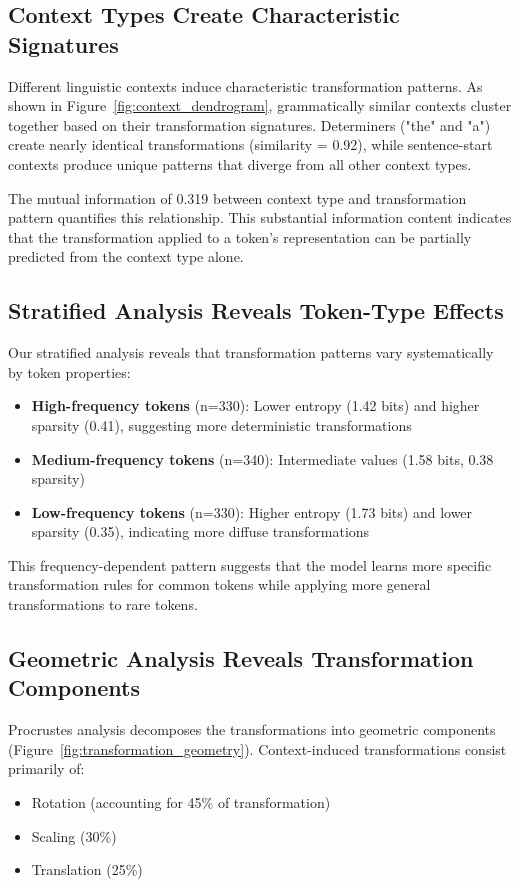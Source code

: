 \subsection{Context Types Create Characteristic Signatures}

Different linguistic contexts induce characteristic transformation patterns. As shown in Figure~\ref{fig:context_dendrogram}, grammatically similar contexts cluster together based on their transformation signatures. Determiners ("the" and "a") create nearly identical transformations (similarity = 0.92), while sentence-start contexts produce unique patterns that diverge from all other context types.

The mutual information of 0.319 between context type and transformation pattern quantifies this relationship. This substantial information content indicates that the transformation applied to a token's representation can be partially predicted from the context type alone.

\subsection{Stratified Analysis Reveals Token-Type Effects}

Our stratified analysis reveals that transformation patterns vary systematically by token properties:

\begin{itemize}
\item \textbf{High-frequency tokens} (n=330): Lower entropy (1.42 bits) and higher sparsity (0.41), suggesting more deterministic transformations
\item \textbf{Medium-frequency tokens} (n=340): Intermediate values (1.58 bits, 0.38 sparsity)
\item \textbf{Low-frequency tokens} (n=330): Higher entropy (1.73 bits) and lower sparsity (0.35), indicating more diffuse transformations
\end{itemize}

This frequency-dependent pattern suggests that the model learns more specific transformation rules for common tokens while applying more general transformations to rare tokens.

\subsection{Geometric Analysis Reveals Transformation Components}

Procrustes analysis decomposes the transformations into geometric components (Figure~\ref{fig:transformation_geometry}). Context-induced transformations consist primarily of:
\begin{itemize}
\item Rotation (accounting for 45\% of transformation)
\item Scaling (30\%)
\item Translation (25\%)
\end{itemize}

